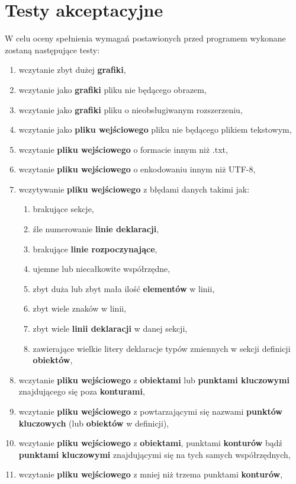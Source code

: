 \documentclass[hidelinks,10pt,a4paper]{article}
\begin{document}
\section{Testy akceptacyjne}
W celu oceny spełnienia wymagań postawionych przed programem wykonane zostaną następujące testy:
\begin{enumerate}
\item wczytanie zbyt dużej \textbf{grafiki},
\item wczytanie jako \textbf{grafiki} pliku nie będącego obrazem,
\item wczytanie jako \textbf{grafiki} pliku o nieobsługiwanym rozszerzeniu,
\item wczytanie jako \textbf{pliku wejściowego} pliku nie będącego plikiem tekstowym,
\item wczytanie \textbf{pliku wejściowego} o formacie innym niż .txt,
\item wczytanie \textbf{pliku wejściowego} o enkodowaniu innym niż UTF-8,
\item wczytywanie \textbf{pliku wejściowego} z błędami danych takimi jak:
\begin{enumerate}
\item brakujące sekcje,
\item źle numerowanie \textbf{linie deklaracji},
\item brakujące \textbf{linie rozpoczynające},
\item ujemne lub niecałkowite współrzędne,
\item zbyt duża lub zbyt mała ilość \textbf{elementów} w linii,
\item zbyt wiele znaków w linii,
\item zbyt wiele \textbf{linii deklaracji} w danej sekcji,
\item zawierające wielkie litery deklaracje typów zmiennych w sekcji definicji \textbf{obiektów},
\end{enumerate}
\item wczytanie \textbf{pliku wejściowego} z \textbf{obiektami} lub \textbf{punktami kluczowymi} znajdującego się poza \textbf{konturami},
\item wczytanie \textbf{pliku wejściowego} z powtarzającymi się nazwami \textbf{punktów kluczowych} (lub \textbf{obiektów} w definicji),
\item wczytanie \textbf{pliku wejściowego} z \textbf{obiektami}, punktami \textbf{konturów} bądź \textbf{punktami kluczowymi} znajdującymi się na tych samych współrzędnych,
\item wczytanie \textbf{pliku wejściowego} z mniej niż trzema punktami \textbf{konturów},

\end{enumerate}
\end{document}
